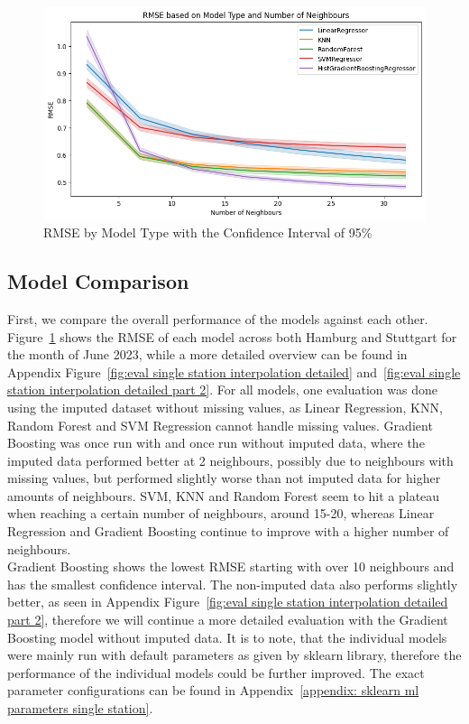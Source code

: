 \begin{figure}[ht]
  \centering
  \includegraphics[width=1\textwidth]{images/rmse_by_model_type.png}
  \caption{RMSE by Model Type with the Confidence Interval of 95\%}
  \label{fig:rmse by model type}
\end{figure}

\subsection{Model Comparison}

First, we compare the overall performance of the models against each other. Figure~\ref{fig:rmse by model type} shows the RMSE of each model across both Hamburg and Stuttgart for the month of June 2023, while a more detailed overview can be found in Appendix Figure~\ref{fig:eval single station interpolation detailed} and~\ref{fig:eval single station interpolation detailed part 2}. For all models, one evaluation was done using the imputed dataset without missing values, as Linear Regression, KNN, Random Forest and SVM Regression cannot handle missing values. Gradient Boosting was once run with and once run without imputed data, where the imputed data performed better at 2 neighbours, possibly due to neighbours with missing values, but performed slightly worse than not imputed data for higher amounts of neighbours. SVM, KNN and Random Forest seem to hit a plateau when reaching a certain number of neighbours, around 15-20, whereas Linear Regression and Gradient Boosting continue to improve with a higher number of neighbours.\\
Gradient Boosting shows the lowest RMSE starting with over 10 neighbours and has the smallest confidence interval. The non-imputed data also performs slightly better, as seen in Appendix Figure~\ref{fig:eval single station interpolation detailed part 2}, therefore we will continue a more detailed evaluation with the Gradient Boosting model without imputed data. It is to note, that the individual models were mainly run with default parameters as given by sklearn library, therefore the performance of the individual models could be further improved. The exact parameter configurations can be found in Appendix~\ref{appendix: sklearn ml parameters single station}.

